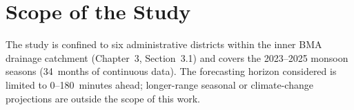 \section{Scope of the Study}
The study is confined to six administrative districts within the inner BMA drainage catchment (Chapter~3, Section~3.1) and covers the 2023--2025 monsoon seasons (34~months of continuous data). The forecasting horizon considered is limited to 0--180~minutes ahead; longer-range seasonal or climate-change projections are outside the scope of this work.
